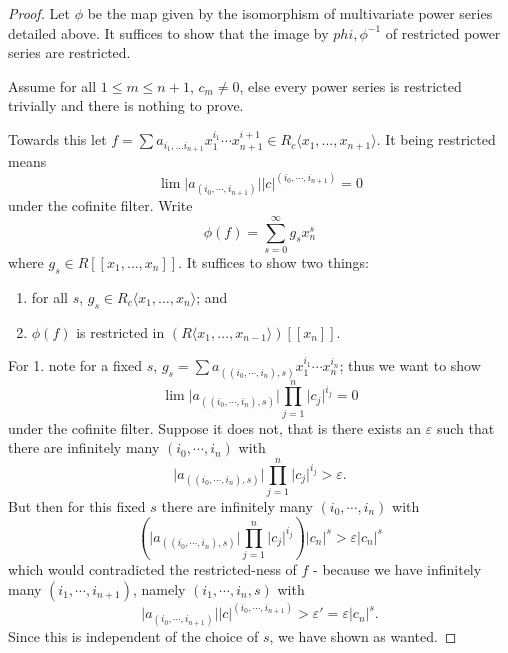 \begin{proof}
Let $\phi$ be the map given by the isomorphism of multivariate power series detailed above. It
suffices to show that the image by $phi, \phi^{-1}$ of restricted power series are restricted.

Assume for all $1 \leq m \leq n+1$, $c_m \neq 0$, else every power series is restricted trivially
and there is nothing to prove.

Towards this let $f = \sum a_{i_1, \dots i_{n+1}} x_1^{i_1} \cdots x_{n+1}^{i+1} \in
R_c \langle x_1, \dots, x_{n + 1} \rangle$. It being restricted means
\[
  \lim \lvert a_{(i_0, \cdots, i_{n+1})} \rvert \lvert c \rvert^{(i_0, \cdots, i_{n+1})} = 0
\]
under the cofinite filter. Write
\[
  \phi (f) = \sum_{s = 0}^\infty g_s x_n^s
\]
where $g_s \in R [ \! [ x_1, \dots, x_n ] \! ]$.
It suffices to show two things:
\begin{enumerate}
  \item for all $s$, $g_s \in R_c \langle x_1, \dots, x_n \rangle$; and
  \item $\phi (f)$ is restricted in $(R \langle x_1, \dots, x_{n-1} \rangle)[ \! [x_n] \! ]$.
\end{enumerate}

For 1. note for a fixed $s$, $g_s = \sum a_{((i_0, \cdots, i_n),s)} x_1^{i_1} \cdots x_n^{i_n}$;
thus we want to show
\[
  \lim \lvert a_{((i_0, \cdots, i_n), s)} \rvert \prod_{j=1}^{n} \lvert c_j \rvert ^{i_j} = 0
\]
under the cofinite filter. Suppose it does not, that is there exists an $\varepsilon$ such that there
are infinitely many $(i_0, \cdots, i_n)$ with
\[
  \lvert a_{((i_0, \cdots, i_n), s)} \rvert \prod_{j=1}^{n} \lvert c_j \rvert ^{i_j} > \varepsilon.
\]
But then for this fixed $s$ there are infinitely many $(i_0, \cdots, i_n)$ with
\[
  \left( \lvert a_{((i_0, \cdots, i_n), s)} \rvert \prod_{j=1}^{n} \lvert c_j \rvert ^{i_j} \right)
  \lvert c_n \rvert^s > \varepsilon \lvert c_n \rvert^s
\]
which would contradicted the restricted-ness of $f$ - because we have infinitely many $(i_1, \cdots, i_{n+1})$,
namely $(i_1, \cdots, i_n, s)$ with
\[
  \lvert a_{(i_0, \cdots, i_{n+1})} \rvert \lvert c \rvert^{(i_0, \cdots, i_{n+1})} > \varepsilon' =
  \varepsilon \lvert c_n \rvert^s.
\]
Since this is independent of the choice of $s$, we have shown as wanted.


\end{proof}

